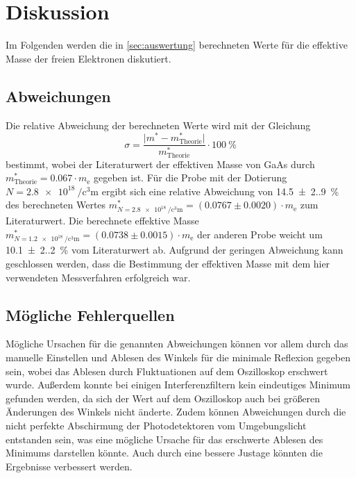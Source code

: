 \section{Diskussion}
\label{sec:diskussion}

Im Folgenden werden die in \autoref{sec:auswertung} berechneten Werte für die effektive Masse der freien Elektronen diskutiert.

\subsection{Abweichungen}

Die relative Abweichung der berechneten Werte wird mit der Gleichung
\begin{equation*}
    \sigma = \frac{\lvert m^* - m^*_\text{Theorie} \rvert}{m^*_\text{Theorie}} \cdot \SI{100}{\percent}
\end{equation*}
bestimmt,
wobei der Literaturwert der effektiven Masse von GaAs durch $m^*_\text{Theorie} = 0.067 \cdot m_\text{e}$ \cite{theoriewert} gegeben ist.
Für die Probe mit der Dotierung $N=\SI[per-mode=reciprocal]{2.8e18}{\per\cubic\centi\meter}$ ergibt sich eine relative Abweichung von \SI{14.5(2.9)}{\percent} des berechneten Wertes $m^*_{N=\SI[per-mode=reciprocal]{2.8e18}{\per\cubic\centi\meter}} = (0.0767 \pm 0.0020) \cdot m_\text{e}$ zum Literaturwert.
Die berechnete effektive Masse $m^*_{N=\SI[per-mode=reciprocal]{1.2e18}{\per\cubic\centi\meter}} = (0.0738 \pm 0.0015) \cdot m_\text{e}$ der anderen Probe weicht um \SI{10.1(2.2)}{\percent} vom Literaturwert ab.
Aufgrund der geringen Abweichung kann geschlossen werden,
dass die Bestimmung der effektiven Masse mit dem hier verwendeten Messverfahren erfolgreich war.


\subsection{Mögliche Fehlerquellen}

Mögliche Ursachen für die genannten Abweichungen können vor allem durch das manuelle Einstellen und Ablesen des Winkels für die minimale Reflexion gegeben sein,
wobei das Ablesen durch Fluktuationen auf dem Oszilloskop erschwert wurde.
Außerdem konnte bei einigen Interferenzfiltern kein eindeutiges Minimum gefunden werden,
da sich der Wert auf dem Oszilloskop auch bei größeren Änderungen des Winkels nicht änderte.
Zudem können Abweichungen durch die nicht perfekte Abschirmung der Photodetektoren vom Umgebungslicht entstanden sein,
was eine mögliche Ursache für das erschwerte Ablesen des Minimums darstellen könnte.
Auch durch eine bessere Justage könnten die Ergebnisse verbessert werden.
